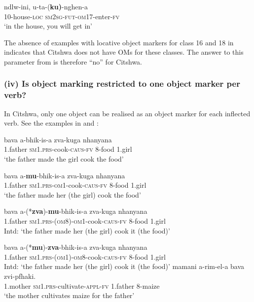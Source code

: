 \documentclass[output=paper]{langscibook}
\begin{document}
\ex\label{ex:ngunga:35d}
\gll ndlw-ini,   u-ta-(\textbf{ku)}{}-nghen-a  \\
10-house-\textsc{loc}  {\textsc{sm2sg}-\textsc{fut}}{}-{\textsc{om}17-}enter-{\textsc{fv}}   \\
\glt ‘in the house, you will get in’
\z
\z

The absence of examples with locative object markers for class 16 and 18 in  indicates that Citshwa does not have OMs for these classes. The answer to this parameter from \citet{MartenKula2012} is therefore ``no'' for Citshwa.

 \subsubsection{(iv) Is object marking restricted to one object marker per verb?}

In Citshwa, only one object can be realised as an object marker for each inflected verb. See the examples in  and : 

\ea\label{ex:ngunga:36}
\ea\label{ex:ngunga:36a} \gll bava    a-bhik-is-a    zva-kuga  nhanyana\\
1.father  {\textsc{sm1}.\textsc{prs}-}cook{{}-\textsc{caus}-\textsc{fv}}  8-food    1.girl      \\
\glt ‘the father made the girl cook the food’


\ex\label{ex:ngunga:36b} \gll  bava    a-\textbf{mu}{}-bhik-is-a    zva-kuga  nhanyana   \\
1.father  {\textsc{sm1}.\textsc{prs}-\textsc{om}1-}cook{{}-\textsc{caus}-\textsc{fv}}  8-food    1.girl\\
\glt ‘the father made her (the girl) cook the food’


\ex\label{ex:ngunga:36c} \gll bava    a-(*\textbf{zva})-\textbf{mu}{}-bhik-is-a  zva-kuga  nhanyana \\
1.father  {\textsc{sm1}.\textsc{prs}-(\textsc{om}8)-\textsc{om}1-}cook{{}-\textsc{caus}-\textsc{fv}}  8-food    1.girl\\
\glt Intd: ‘the father made her (the girl) cook it (the food)’


\ex\label{ex:ngunga:36d} \gll bava    a-(*\textbf{mu})-\textbf{zva}{}-bhik-is-a  zva-kuga  nhanyana \\
1.father  {\textsc{sm1}.\textsc{prs}-(\textsc{om}1})-\textsc{om}8-cook{{}-\textsc{caus}-\textsc{fv}}  8-food    1.girl\\
\glt Intd: ‘the father made her (the girl) cook it (the food)’
\z
\ex\label{ex:ngunga:37}
\ea\label{ex:ngunga:37a} \gll mamani  a-rim-el-a      bava    zvi-pfhaki.\\
1.mother  {\textsc{sm1}.\textsc{prs}}{}-cultivate-{\textsc{appl}}{}-{\textsc{fv}}    1.father  8-maize\\
\glt ‘the mother cultivates maize for the father’
\end{document}

